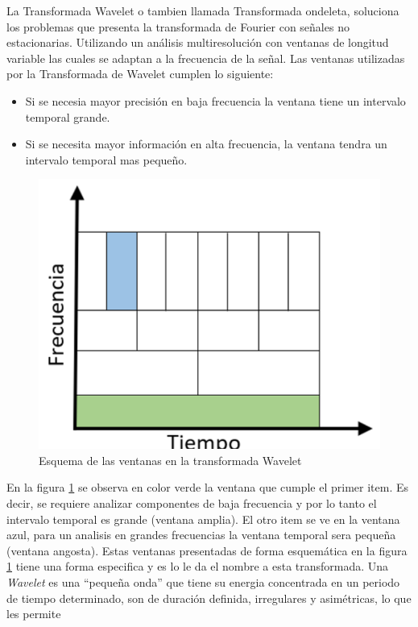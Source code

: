 \documentclass{article}
\begin{document}
La Transformada Wavelet o tambien llamada Transformada ondeleta, soluciona los problemas que presenta la 
transformada de Fourier con señales no estacionarias. Utilizando un análisis multiresolución con ventanas de longitud variable las cuales se adaptan a la frecuencia de la señal.
Las ventanas utilizadas por la Transformada de Wavelet cumplen lo siguiente:
\begin{itemize}
    \item Si se necesia mayor precisión en baja frecuencia la ventana tiene un intervalo temporal grande.
    \item Si se necesita mayor información en alta frecuencia, la ventana tendra un intervalo temporal mas pequeño.
\end{itemize}
\begin{figure}[H]
    \centering
    \includegraphics[scale=0.35]{Fig/66}
    \caption{Esquema de las ventanas en la transformada Wavelet}
    \label{comp}
\end{figure}
En la figura \ref{comp} se observa en color verde la ventana que cumple el primer item. Es decir, se requiere analizar componentes de baja frecuencia y por lo tanto el intervalo temporal es grande (ventana amplia). El otro item se ve en la ventana azul, para un analisis 
en grandes frecuencias la ventana temporal sera pequeña (ventana angosta).
Estas ventanas presentadas de forma esquemática en la figura \ref{comp} tiene una forma especifica y es lo le da el nombre a esta transformada. Una \textit{Wavelet} es una ``pequeña onda'' que tiene su energia concentrada en un periodo de tiempo determinado, son de duración definida, irregulares y asimétricas, lo que les permite 
\end{document}
